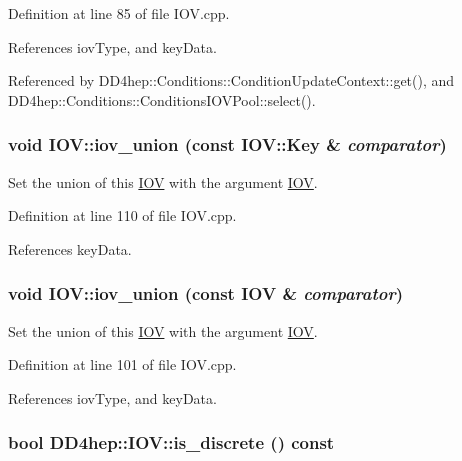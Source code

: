 Definition at line 85 of file IOV.cpp.

References iovType, and keyData.

Referenced by DD4hep::Conditions::ConditionUpdateContext::get(), and DD4hep::Conditions::ConditionsIOVPool::select().\hypertarget{class_d_d4hep_1_1_i_o_v_ad6a050933305a95b61d26975c057590e}{
\subsubsection[{iov\_\-union}]{\setlength{\rightskip}{0pt plus 5cm}void IOV::iov\_\-union (const {\bf IOV::Key} \& {\em comparator})}}
\label{class_d_d4hep_1_1_i_o_v_ad6a050933305a95b61d26975c057590e}


Set the union of this \hyperlink{class_d_d4hep_1_1_i_o_v}{IOV} with the argument \hyperlink{class_d_d4hep_1_1_i_o_v}{IOV}. 

Definition at line 110 of file IOV.cpp.

References keyData.\hypertarget{class_d_d4hep_1_1_i_o_v_aa0261c65bd7ffa708862bdd0e69845d9}{
\subsubsection[{iov\_\-union}]{\setlength{\rightskip}{0pt plus 5cm}void IOV::iov\_\-union (const {\bf IOV} \& {\em comparator})}}
\label{class_d_d4hep_1_1_i_o_v_aa0261c65bd7ffa708862bdd0e69845d9}


Set the union of this \hyperlink{class_d_d4hep_1_1_i_o_v}{IOV} with the argument \hyperlink{class_d_d4hep_1_1_i_o_v}{IOV}. 

Definition at line 101 of file IOV.cpp.

References iovType, and keyData.\hypertarget{class_d_d4hep_1_1_i_o_v_a37f1849ee9dfed07510a1628bb4b5796}{
\subsubsection[{is\_\-discrete}]{\setlength{\rightskip}{0pt plus 5cm}bool DD4hep::IOV::is\_\-discrete () const}}
\label{class_d_d4hep_1_1_i_o_v_a37f1849ee9dfed07510a1628bb4b5796}


